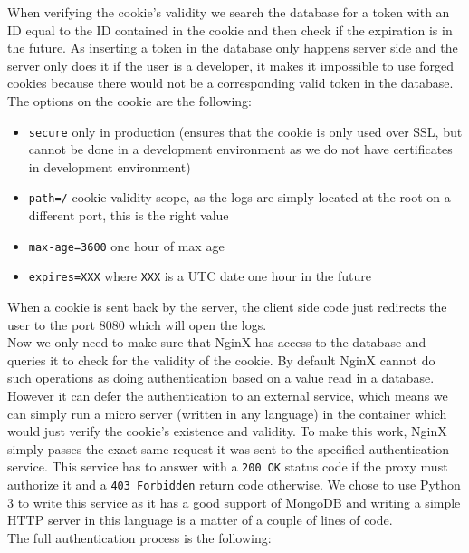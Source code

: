 When verifying the cookie's validity we search the database for a token with an ID equal to the ID contained in the cookie and then check if the expiration is in the future. As inserting a token in the database only happens server side and the server only does it if the user is a developer, it makes it impossible to use forged cookies because there would not be a corresponding valid token in the database. The options on the cookie are the following:
\begin{itemize}
	\item \texttt{secure} only in production (ensures that the cookie is only used over SSL, but cannot be done in a development environment as we do not have certificates in development environment)
	\item \texttt{path=/} cookie validity scope, as the logs are simply located at the root on a different port, this is the right value
	\item \texttt{max-age=3600} one hour of max age
	\item \texttt{expires=XXX} where \texttt{XXX} is a UTC date one hour in the future
\end{itemize}
When a cookie is sent back by the server, the client side code just redirects the user to the port 8080 which will open the logs.\\
Now we only need to make sure that NginX has access to the database and queries it to check for the validity of the cookie. By default NginX cannot do such operations as doing authentication based on a value read in a database. However it can defer the authentication to an external service, which means we can simply run a micro server (written in any language) in the container which would just verify the cookie's existence and validity. To make this work, NginX simply passes the exact same request it was sent to the specified authentication service. This service has to answer with a \texttt{200 OK} status code if the proxy must authorize it and a \texttt{403 Forbidden} return code otherwise. We chose to use Python 3 to write this service as it has a good support of MongoDB and writing a simple HTTP server in this language is a matter of a couple of lines of code.\\
The full authentication process is the following:
